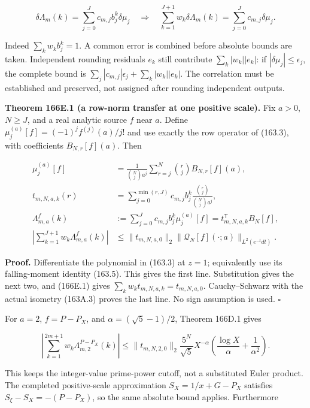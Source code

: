 \documentclass[
  11pt,
]{book}
\begin{document}
\[
\delta\Lambda_m(k)=\sum_{j=0}^Jc_{m,j}b_j^k\delta\mu_j
\quad\Longrightarrow\quad
\boxed{\sum_{k=1}^{J+1}w_k\delta\Lambda_m(k)
 =\sum_{j=0}^Jc_{m,j}\delta\mu_j.}
\tag{166E.1}
\]

Indeed \(\sum_kw_kb_j^k=1\). A common error is combined before absolute
bounds are taken. Independent rounding residuals \(e_k\) still
contribute \(\sum_k|w_k||e_k|\): if \(|\delta\mu_j|\le\epsilon_j\), the
complete bound is \(\sum_j|c_{m,j}|\epsilon_j+\sum_k|w_k||e_k|\). The
correlation must be established and preserved, not assigned after
rounding independent outputs.

\textbf{Theorem 166E.1 (a row-norm transfer at one positive scale).} Fix
\(a>0\), \(N\ge J\), and a real analytic source \(f\) near \(a\). Define
\(\mu_j^{(a)}[f]=(-1)^jf^{(j)}(a)/j!\) and use exactly the row operator
of (163.3), with coefficients \(B_{N,r}[f](a)\). Then

\[
\begin{aligned}
\mu_j^{(a)}[f]&=\frac1{\binom Nj a^j}
 \sum_{r=j}^N\binom rj B_{N,r}[f](a),\\
t_{m,N,a,k}(r)&=\sum_{j=0}^{\min(r,J)}
 c_{m,j}b_j^k\frac{\binom rj}{\binom Nj a^j},\\
\Lambda_{m,a}^f(k)&:=\sum_{j=0}^Jc_{m,j}b_j^k\mu_j^{(a)}[f]
 =t_{m,N,a,k}^{\mathsf T}B_N[f],\\
\left|\sum_{k=1}^{J+1}w_k\Lambda_{m,a}^f(k)\right|
 &\le\|t_{m,N,a,0}\|_2
   \|\mathcal Q_N[f](\cdot;a)\|_{L^2(e^{-t}dt)}.
\end{aligned}
\tag{166E.2}
\]

\textbf{Proof.} Differentiate the polynomial in (163.3) at \(z=1\);
equivalently use its falling-moment identity (163.5). This gives the
first line. Substitution gives the next two, and (166E.1) gives
\(\sum_kw_kt_{m,N,a,k}=t_{m,N,a,0}\). Cauchy--Schwarz with the actual
isometry (163A.3) proves the last line. No sign assumption is used.
\(\square\)

For \(a=2\), \(f=P-P_X\), and \(\alpha=(\sqrt5-1)/2\), Theorem 166D.1
gives

\[
\left|\sum_{k=1}^{2m+1}w_k\Lambda_{m,2}^{P-P_X}(k)\right|
\le\|t_{m,N,2,0}\|_2\frac{5^N}{\sqrt5}X^{-\alpha}
 \left(\frac{\log X}{\alpha}+\frac1{\alpha^2}\right).
\tag{166E.3}
\]

This keeps the integer-value prime-power cutoff, not a substituted Euler
product. The completed positive-scale approximation \(S_X=1/x+G-P_X\)
satisfies \(S_\xi-S_X=-(P-P_X)\), so the same absolute bound applies.
Furthermore
\end{document}

